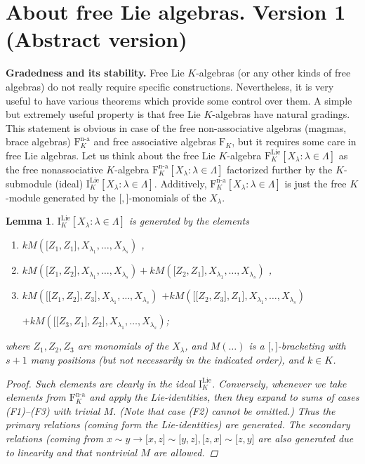 \documentclass[11pt,a4paper]{amsart}
\newcommand{\plabel}[1]{ \label{#1}}
\newcommand{\plabel}[1]{ \label{#1}\rlap{\smash{${}^{^{[#1]}}$}}}
\newcommand{\plabel}[1]{ \label{#1}}
\DeclareMathOperator{\nonass}{n-a}
\DeclareMathOperator{\Lie}{Lie}
\newcommand{\bo}{\boldsymbol}
\theoremstyle{definition}
\theoremstyle{plain}
\newtheorem{lemma}[point]{Lemma}
\begin{document}
\section{About free Lie algebras. Version 1 (Abstract version)}\plabel{sec:free1}
\textbf{Gradedness and its stability.}
Free Lie $K$-algebras (or any other kinds of free algebras) do not really require specific constructions.
Nevertheless, it  is very useful to have various theorems which provide some control over them.
A simple but extremely useful property is that free Lie $K$-algebras have natural gradings.
This statement is obvious in case of the free non-associative algebras (magmas, brace algebras) $\mathrm F^{\nonass}_K$
 and free  associative algebras $\mathrm F_K$, but it requires some care in free Lie algebras.
Let us think about the free Lie $K$-algebra $\mathrm F_K^{\Lie}[X_\lambda :\lambda\in\Lambda]$
 as the free nonassociative $K$-algebra $\mathrm F^{\nonass}_K[X_\lambda :\lambda\in\Lambda]$
 factorized further by the $K$-submodule (ideal) $\mathrm I_K^{\Lie}[X_\lambda :\lambda\in\Lambda]$.
Additively, $\mathrm F^{\nonass}_K[X_\lambda :\lambda\in\Lambda]$ is just the
 free $K$-module generated by the $\bo[,\bo]$-monomials of the $X_\lambda$.
\begin{lemma}\plabel{lem:freelie}
$\mathrm I^{\Lie}_K[X_\lambda :\lambda\in\Lambda]$ is generated by the elements
\begin{enumerate}
\item[(F1)] $k M( \bo[Z_1,Z_1\bo],X_{\lambda_1},\ldots, X_{\lambda_s})$ ,
\item[(F2)] $k M( \bo[Z_1,Z_2\bo],X_{\lambda_1},\ldots, X_{\lambda_s})+kM( \bo[Z_2,Z_1\bo],X_{\lambda_1},\ldots, X_{\lambda_s}) $ ,
\item[(F3)] $k M( \bo[\bo[Z_1,Z_2\bo],Z_3\bo],X_{\lambda_1},\ldots, X_{\lambda_s})$ $+kM( \bo[\bo[Z_2,Z_3\bo],Z_1\bo],X_{\lambda_1},\ldots, X_{\lambda_s})$

$+kM( \bo[\bo[Z_3,Z_1\bo],Z_2\bo],X_{\lambda_1},\ldots, X_{\lambda_s})
 $;\end{enumerate}
 where $Z_1,Z_2,Z_3$ are monomials of the $X_\lambda$, and $M(\ldots)$ is a $\bo[,\bo]$-bracketing
 with $s+1$ many positions (but not necessarily in the indicated order), and $k\in K$.
\begin{proof}
Such elements are clearly in the ideal $\mathrm I^{\Lie}_K$.
Conversely, whenever we take elements from  $\mathrm F^{\nonass}_K$ and
 apply the Lie-identities, then they expand to sums of cases (F1)--(F3) with trivial $M$.
(Note that case (F2) cannot be omitted.)
Thus the primary relations (coming form the Lie-identities) are generated. The secondary relations
 (coming from $x\sim y\rightarrow \bo[x,z\bo]\sim \bo[y,z\bo], \bo[z,x\bo]\sim \bo[z,y\bo]$ are
 also generated due to linearity and that nontrivial $M$ are allowed.
\end{proof}
\end{lemma}
\end{document}
